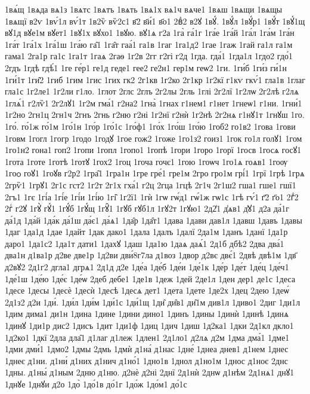 {1вѧ́щ
1вѧда
вѧ1з
1вѧтс
1вѧтъ
1вѧть
1вѧ1х
вѧ1ч
вѧче1
1вѧш
1вѧщи
1вѧщы
1вѧщї
в2ѵ
1вѵ́1л
вѵ́1т
1в2ѷ
вѷ2с1
в҃2
в҃и́1
в҃о1
2вⷣ2
в2ꙋ
1вꙋ́.
1вꙋ́л
1вꙋ́р1
1вꙋ́т
1вꙋ́1щ
вꙋ1д
вꙋе1м
вꙋет1
1вꙋ1х
вꙋхо1
1вꙋю.
вꙋ1ѧ
г2а
1га̀
га́1г
1га́е
1га́й
1га́л
1га́м
1га́н
1га́т
1га́1х
1га́1ш
1га́ю
га̑1
1га̑т
гаа́1
га1в
1гаг
1га1д2
1гае
1гаж
1гай
га1л
га1м
гама1
2га1р
га1с
1га1т
1гаѧ
2гаѳ
1г2в
2гг
г2гі
г2д
1гда.
гда́1
1гда1л
1гдо2
гдо́1
2гдъ
1гдѣ
гдѣ́1
1ге
ге́р1
ге1д
геде1
гее2
ге2н1
гер1м
геѡ2
1ги.
1ги́б
1ги́з
ги́1н
1ги́1т
1ги̑2
1гиб
1гим
1гис
1гих
гк2
2г1кв
1г2ко
2г1кр
1г2кї
г1кѵ
гкѵ́1
гла1в
1глаг
гла1с
1г2ле1
1г2ли
г1ло.
1глот
2глс
2глъ
2г2лы
2гль
1глі
2г2лї
1г2лѡ
2г2лѣ
г2лѧ
1глѧ́1
г2лѷ1
2г2лꙋ1
1г2м
гма́1
г2на2
1гна̀
1гнах
г1нем1
г1нет
1гнеѡ1
г1ни.
1гни́1
1г2но
2гн1ц
2гн1ч
2гнъ
2гнь
г2ню
г2ні
1г2нї
г2нѝ
1г2нѣ
2г2нѧ
г1нꙋ1т
1гнꙋш
1го.
1го́.
го́1ж
го́1м
1го́1н
1го́р
1го́1с
1го́ф1
1го́х
1го́ш
1го́ю
1гоб2
го1в2
1гова
1гови
1говм
1гогл
1гогр
1годо
1годꙋ
1гое
гож2
1гоже
1го1з2
гоиз1
1гок
го1л
голꙋ1
1гом
1го1н2
гона1
гоп2
1гопи
1гопл
1гопо1
1гопѣ
1гори
1горо
1горї
1госв
1госѧ
госꙋ1
1гота
1готе
1готѣ
1готꙋ
1гох2
1гоц
1гоча
гочє1
1гою
1гоѡч
1го1ѧ
гоѧв1
1гоѹ
1гоѻ
гоꙋ1
1гоꙋв
г2р2
1гра̑1
1гра1н
1гре
гре́1
гре1м
2гро
гро1м
грі́1
1грї
1грѣ
1грѧ
2грѷ1
1грꙋ1
2г1с
гст2
1г2т
2г1х
гха́1
г2ц
2гца
1гцѣ
2г1ч
2г1ш2
гша1
гше1
гшї1
2гъ1
1гє
1гі́а
1гі́е
1гі́и
1гі́ю
1гі̑
1г2ї1
1гѝ
1гѡ
гѡ́д1
гѡ́1ж
гѡ1с
1гѣ
гѵ́1
г҃2
г҃о1
2гⷣ2
2гⷭ
г2ꙋ
1гꙋ̀
гꙋ́1
1гꙋ́б
1гꙋ́щ
1гꙋ̑1
1гꙋб
гꙋб1л
1гꙋ2т
1гꙋю1
2д2̾1
д̾ѧв1
д̾ꙋ1
д2а
да́1г
да́1д
1да́й
1да́к
да́1ш
да́є1
да́ѧ1
1да̑р
1да̑т1
1дава
1дави
дав1л
1давш
1давъ
1давы
1даг
1да1д
1дае
1дайт
1дак
дако1
1дала
1далъ
1далї
2да1м
1данъ
1данї
1да1р
даро1
1да1с2
1да1т
дати1
1дахꙋ
1даш
1да1ю
1даѧ
даѧ́1
2д1б
дбѣ2
2два
два́1
два1н
д1ва1р
д2ве
две1р
1д2ви
дви́8г7ла
д1воз
1двор
д2вє
двє́1
2двѣ
двѣ1м
1дв҃
д2вꙋ2
2д1г2
дгла1
дгрѧ1
2д1д
д2е
1де́а
1де́б
1де́и
1де́1к
1де́р
1де́т
1де́ц
1де́ч1
1де́1ш
1де́ю
1де́є
1де́ѡ
2деб
дебе1
1де1в
1деж
1дей
2де1л
1ден
дер1
де1с
1деса
1десе
1десы
1десѐ
1десѝ
1десѣ
1десѧ
дет1
1дета
1дете
1де2х
1дец
2дею
1деѡ́
2д1з2
д2и
1ди́.
1ди́л
1ди́м
1ди́1с
1ди́1щ
1ди̑
ди̑в1
ди̑1м
див1л
1диво1
2диг
1ди1л
1дим
дима1
ди1н
1дина
1дине
1дини
дино1
1динъ
1дины
1динѝ
1динѣ
1динѧ
1динꙋ
1ди1р
дис2
1дисъ
1дит
1ди1ф
1диц
1дич
1диш
1д2ка1
1дки
2д1кл
дкло1
1д2ко1
1дкї
2дла
дла̑1
д1лаг
д1леж
1длен1
2д1ло1
д2лѧ
д2м
1дма
дма́1
1дме1
1дми
дми́1
1дмо2
1дмы
2дмь
1дмѝ
д1на́
д1нас
1дне́
1днеа
днев1
д1нем
1днес
1днеє
д1ни.
д1ни́
д1них
д1нич
д1но́1
1дно1в
1днол
д1но1м
1днос
д1ноє
2днс
1дны.
д1ны́
д1ным
2дню
д1ню.
д2нѐ
д2ні
2днї
2д1нѝ
2днѡ
д1нѣм
2д1нѧ1
днꙋ1
1днꙋе
1днꙋи
д2о
1до̀
1до́1в
до́1г
1до́ж
1до́м1
до́1с
}
